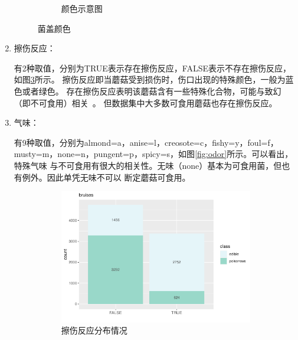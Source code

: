 \documentclass[lang=cn,11pt,a4paper,cite=super]{elegantpaper}
\begin{document}
\begin{enumerate}
\begin{figure}[htb]
\begin{subfigure}[b]{0.3\textwidth}
        \caption{颜色示意图}
        \label{fig:color0}
      \end{subfigure}
      \caption{菌盖颜色}
      \label{fig:capsurfacecol}
   \end{figure}

   \item 擦伤反应：\par 有2种取值，分别为TRUE表示存在擦伤反应，FALSE表示不存在擦伤反应，如图\ref{fig:bru}所示。
   擦伤反应即当蘑菇受到损伤时，伤口出现的特殊颜色，一般为蓝色或者绿色。
   存在擦伤反应表明该蘑菇含有一些特殊化合物，可能与致幻（即不可食用）相关~\cite{bru}。
   但数据集中大多数可食用蘑菇也存在擦伤反应。
   \item 气味：\par 有9种取值，分别为almond=a，anise=l，creosote=c，fishy=y，foul=f，
   musty=m，none=n，pungent=p，spicy=s，如图\ref{fig:odor}所示。可以看出，特殊气味
   与不可食用有很大的相关性。无味（none）基本为可食用菌，但也有例外。因此单凭无味不可以
   断定蘑菇可食用。
   \begin{figure}[htb]
      \begin{subfigure}[t]{0.49\textwidth}
        \centering
        \includegraphics[width=\linewidth]{img/bruises-1.pdf}
      \caption{擦伤反应分布情况}
      \label{fig:bru}
      \end{subfigure}
      \begin{subfigure}[t]{0.50\textwidth}

\end{subfigure}
\end{figure}
\end{enumerate}
\end{document}
